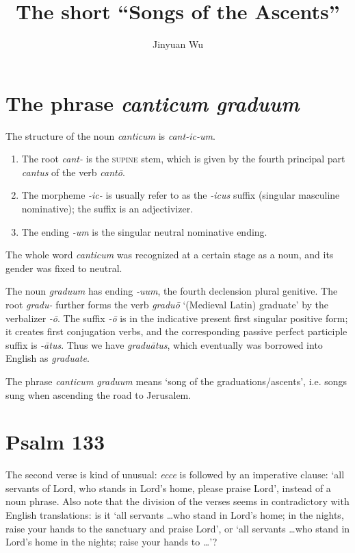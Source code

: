 \documentclass[a4paper, 12pt]{article}
\title{The short ``Songs of the Ascents''}
\author{Jinyuan Wu}
\newcommand{\form}[1]{\emph{#1}}
\newcommand*{\category}[1]{\textsc{#1}}
\newcommand{\translate}[1]{`#1'}
\begin{document}
\maketitle

\section{The phrase \form{canticum graduum}}

The structure of the noun \form{canticum} is 
\form{cant-ic-um}.
\begin{enumerate}
    \item The root \form{cant-} is the \category{supine} stem, 
    which is given by the fourth principal part \form{cantus} 
    of the verb \form{cant\={o}}.
    \item The morpheme \form{-ic-} is usually refer to 
    as the \form{-icus} suffix (singular masculine nominative);
    the suffix is an adjectivizer.
    \item The ending \form{-um} is the singular neutral nominative ending. 
\end{enumerate}
The whole word \form{canticum} was recognized at a certain stage 
as a noun, and its gender was fixed to neutral.

The noun \form{graduum} has ending \form{-uum},
the fourth declension plural genitive.
The root \form{gradu-} further forms the verb 
\form{gradu\={o}} \translate{(Medieval Latin) graduate} 
by the verbalizer \form{-\={o}}.
The suffix \form{-\={o}} is in the indicative present first singular positive form; 
it creates first conjugation verbs, 
and the corresponding passive perfect participle suffix is \form{-ātus}.
Thus we have \form{graduātus},
which eventually was borrowed into English as \form{graduate}.

The phrase \form{canticum graduum} means \translate{song of the graduations/ascents}, 
i.e. songs sung when ascending the road to Jerusalem.

\section{Psalm 133} 

The second verse is kind of unusual: 
\form{ecce} is followed by an imperative clause:
\translate{all servants of Lord, who stands in Lord's home, 
please praise Lord}, 
instead of a noun phrase.
Also note that the division of the verses seems in contradictory with 
English translations: 
is it \translate{all servants \dots who stand in Lord's home; 
in the nights, raise your hands to the sanctuary and praise Lord}, 
or \translate{all servants \dots who stand in Lord's home in the nights; 
raise your hands to \dots}?
\end{document}
